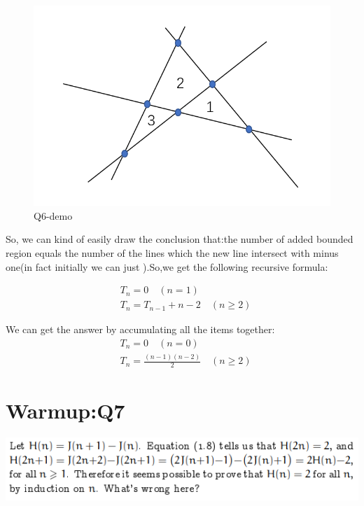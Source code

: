 \documentclass[a4paper]{article}
\begin{document}
\begin{figure}[htb]
	\includegraphics[scale=0.5]{Q64.png}
	\caption{Q6-demo}
\end{figure}

So, we can kind of easily draw the conclusion that:the number of added bounded region equals the number of the lines which the new line intersect with minus one(in fact initially we can just ).So,we get the following recursive formula:


	\begin{align}
		&T_{n}=0 \quad (n=1) \\
		&T_{n}=T_{n-1}+n-2 \quad (n\ge2)
	\end{align}

We can get the answer by accumulating all the items together:
\begin{align}
&T_{n}=0 \quad (n=0) \\
&T_{n}=\frac{(n-1)(n-2)}{2} \quad (n\ge2)
\end{align}


\section*{Warmup:Q7}
\includegraphics[scale=1.2]{Q7.png}
\end{document}
